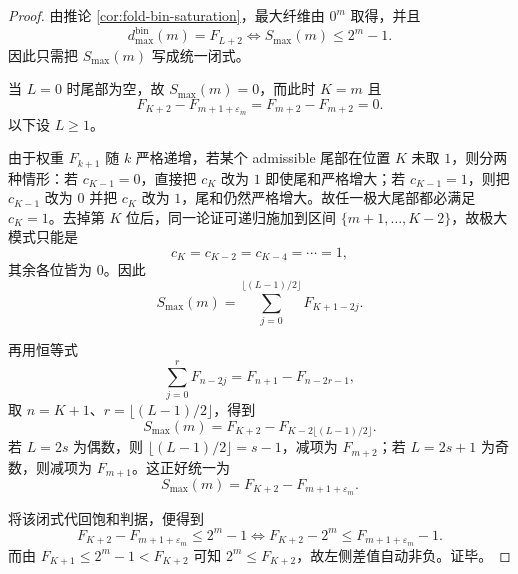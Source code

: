 \begin{proof}
由推论 \ref{cor:fold-bin-saturation}，最大纤维由 \(0^m\) 取得，并且
\[
d_{\max}^{\mathrm{bin}}(m)=F_{L+2}
\iff
S_{\max}(m)\le 2^m-1.
\]
因此只需把 \(S_{\max}(m)\) 写成统一闭式。

当 \(L=0\) 时尾部为空，故 \(S_{\max}(m)=0\)，而此时 \(K=m\) 且
\[
F_{K+2}-F_{m+1+\varepsilon_m}=F_{m+2}-F_{m+2}=0.
\]
以下设 \(L\ge 1\)。

由于权重 \(F_{k+1}\) 随 \(k\) 严格递增，若某个 admissible 尾部在位置 \(K\) 未取 \(1\)，则分两种情形：若 \(c_{K-1}=0\)，直接把 \(c_K\) 改为 \(1\) 即使尾和严格增大；若 \(c_{K-1}=1\)，则把 \(c_{K-1}\) 改为 \(0\) 并把 \(c_K\) 改为 \(1\)，尾和仍然严格增大。故任一极大尾部都必满足 \(c_K=1\)。去掉第 \(K\) 位后，同一论证可递归施加到区间 \(\{m+1,\dots,K-2\}\)，故极大模式只能是
\[
c_K=c_{K-2}=c_{K-4}=\cdots=1,
\]
其余各位皆为 \(0\)。因此
\[
S_{\max}(m)=\sum_{j=0}^{\lfloor (L-1)/2\rfloor}F_{K+1-2j}.
\]

再用恒等式
\[
\sum_{j=0}^{r}F_{n-2j}=F_{n+1}-F_{n-2r-1},
\]
取 \(n=K+1\)、\(r=\lfloor (L-1)/2\rfloor\)，得到
\[
S_{\max}(m)
=
F_{K+2}-F_{K-2\lfloor (L-1)/2\rfloor}.
\]
若 \(L=2s\) 为偶数，则 \(\lfloor (L-1)/2\rfloor=s-1\)，减项为 \(F_{m+2}\)；若 \(L=2s+1\) 为奇数，则减项为 \(F_{m+1}\)。这正好统一为
\[
S_{\max}(m)=F_{K+2}-F_{m+1+\varepsilon_m}.
\]

将该闭式代回饱和判据，便得到
\[
F_{K+2}-F_{m+1+\varepsilon_m}\le 2^m-1
\iff
F_{K+2}-2^m\le F_{m+1+\varepsilon_m}-1.
\]
而由 \(F_{K+1}\le 2^m-1<F_{K+2}\) 可知 \(2^m\le F_{K+2}\)，故左侧差值自动非负。证毕。
\end{proof}

